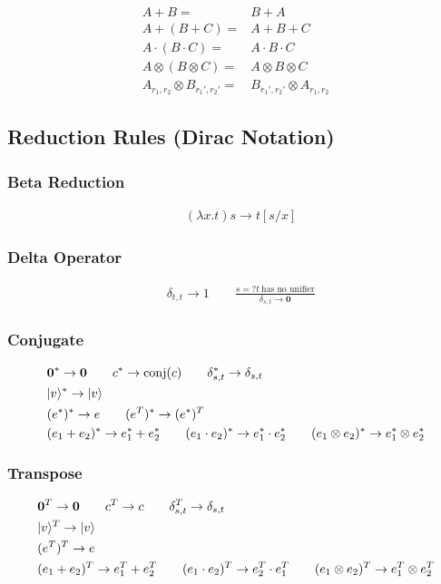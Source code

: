 \begin{align*}
    A + B = & B + A \\
    A + (B + C) = & A + B + C \\
    A \cdot (B \cdot C) = & A \cdot B \cdot C \\
    A \otimes (B \otimes C) = & A \otimes B \otimes C \\
    A_{r_1, r_2} \otimes B_{r_1', r_2'} = & B_{r_1', r_2'} \otimes A_{r_1, r_2}
\end{align*}


\subsection{Reduction Rules (Dirac Notation)}

\subsubsection*{Beta Reduction}
\begin{align*}
    & (\lambda x.t) s \to t[s/x]
\end{align*}


\subsubsection*{Delta Operator}
\begin{align*}
  & \delta_{t, t} \to 1
  \qquad
  \frac{s =? t\ \textrm{has no unifier}}{\delta_{s, t} \to \mathbf{0}}
\end{align*}

\subsubsection*{Conjugate}
\begin{align*}
  & \textbf{0}^* \to \textbf{0}
  \qquad 
  c^* \to \mathrm{conj}(c)
  \qquad 
  \delta_{s,t}^* \to \delta_{s,t}\\
  & |v\rangle^* \to |v\rangle \\
  & (e^*)^* \to e
  \qquad 
  (e^T)^* \to (e^*)^T\\
  & (e_1 + e_2)^* \to e_1^* + e_2^* 
  \qquad (e_1 \cdot e_2)^* \to e_1^* \cdot e_2^* 
  \qquad (e_1 \otimes e_2)^* \to e_1^* \otimes e_2^*
\end{align*}

\subsubsection*{Transpose}
\begin{align*}
  & \textbf{0}^T \to \textbf{0}
  \qquad
  c^T \to c
  \qquad 
  \delta_{s,t}^T \to \delta_{s,t} \\
  & |v\rangle^T \to |v\rangle \\
  & (e^T)^T \to e\\
  & (e_1 + e_2)^T \to e_1^T + e_2^T
  \qquad (e_1 \cdot e_2)^T \to e_2^T \cdot e_1^T 
  \qquad (e_1 \otimes e_2)^T \to e_1^T \otimes e_2^T
\end{align*}


